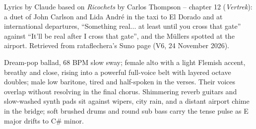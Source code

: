 
\begin{notes}
Lyrics by Claude based on \emph{Ricochets} by Carlos Thompson -- chapter 12 (\emph{Vertrek}): a duet of John Carlson and Lida André in the taxi to El Dorado and at international departures, ``Something real... at least until you cross that gate'' against ``It'll be real after I cross that gate'', and the Müllers spotted at the airport. Retrieved from rataflechera's Suno page (V6, 24 November 2026).
\end{notes}
\begin{style}
Dream-pop ballad, 68 BPM slow sway; female alto with a light Flemish accent, breathy and close, rising into a powerful full-voice belt with layered octave doubles; male low baritone, tired and half-spoken in the verses. Their voices overlap without resolving in the final chorus. Shimmering reverb guitars and slow-washed synth pads sit against wipers, city rain, and a distant airport chime in the bridge; soft brushed drums and round sub bass carry the tense pulse as E major drifts to C\# minor.
\end{style}
